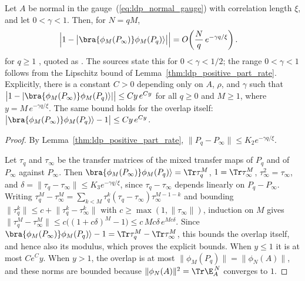 \begin{lemma}
    \label{lem:ldp_positive_part_overlap}
    \leanok
    Let $A$ be normal in the gauge~(\ref{eq:ldp_normal_gauge}) with correlation
    length $\xi$, and let $0<\gamma<1$.
    Then, for $N=qM$,
    \begin{align}
        \Bigl\lvert1-\bigl\lvert\bra{\phi_M(P_\infty)}\phi_M(P_q)\rangle\bigr\rvert\Bigr\rvert
         & =O\!\left(\frac Nq\,e^{-\gamma q/\xi}\right).
        \label{eq:ldp_positive_part_overlap}
    \end{align}
    for $q\ge1$ \cite[Supplemental Material, eq.~(S29)]{Piroli2021LOCC}, quoted as
    \cite[eq.~(S9)]{Malz2024Preparation}. The sources state this for
    $0<\gamma<1/2$; the range $0<\gamma<1$ follows from the Lipschitz bound of
    Lemma~\ref{thm:ldp_positive_part_rate}. Explicitly, there is a constant $C>0$
    depending only on $A$, $\rho$, and $\gamma$ such that
    $\bigl\lvert1-\lvert\bra{\phi_M(P_\infty)}\phi_M(P_q)\rangle\rvert\bigr\rvert
        \le Cy\,e^{Cy}$ for all $q\ge0$ and $M\ge1$, where $y=M\,e^{-\gamma q/\xi}$.
    The same bound holds for the overlap itself:
    $\bigl\lvert\bra{\phi_M(P_\infty)}\phi_M(P_q)\rangle-1\bigr\rvert\le Cy\,e^{Cy}$.
\end{lemma}
\begin{proof}
    \leanok
    By Lemma~\ref{thm:ldp_positive_part_rate},
    $\lVert P_q-P_\infty\rVert\le K_2e^{-\gamma q/\xi}$.

    Let $\tau_q$ and $\tau_\infty$ be the transfer matrices of the mixed
    transfer maps of $P_q$ and of $P_\infty$ against $P_\infty$. Then
    $\bra{\phi_M(P_\infty)}\phi_M(P_q)\rangle=\Tr\tau_q^M$,
    $1=\Tr\tau_\infty^M$, $\tau_\infty^2=\tau_\infty$, and
    $\delta=\lVert\tau_q-\tau_\infty\rVert\le K_3e^{-\gamma q/\xi}$, since
    $\tau_q-\tau_\infty$ depends linearly on $P_q-P_\infty$. Writing
    $\tau_q^M-\tau_\infty^M=\sum_{k<M}\tau_q^k(\tau_q-\tau_\infty)\tau_\infty^{M-1-k}$
    and bounding $\lVert\tau_q^k\rVert\le c+\lVert\tau_q^k-\tau_\infty^k\rVert$
    with $c\ge\max(1,\lVert\tau_\infty\rVert)$, induction on $M$ gives
    $\lVert\tau_q^M-\tau_\infty^M\rVert\le c\bigl((1+c\delta)^M-1\bigr)
        \le c\,Mc\delta\,e^{Mc\delta}$.
    Since $\bra{\phi_M(P_\infty)}\phi_M(P_q)\rangle-1=\Tr\tau_q^M-\Tr\tau_\infty^M$,
    this bounds the overlap itself, and hence also its modulus, which proves the
    explicit bounds. When $y\le1$ it is at most $Ce^{C}y$.
    When $y>1$, the overlap is at most
    $\lVert\phi_M(P_q)\rVert=\lVert\phi_N(A)\rVert$, and these norms are
    bounded because $\lVert\phi_N(A)\rVert^2=\Tr\E_A^{\,N}$ converges to $1$.
\end{proof}

